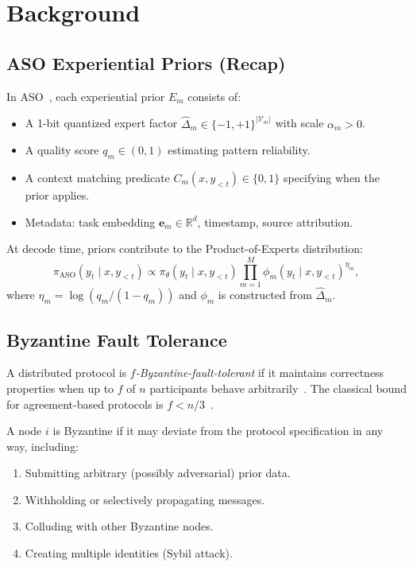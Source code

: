 \section{Background}

\label{sec:background}

\subsection{ASO Experiential Priors (Recap)}

In ASO~\cite{hanzo2026aso}, each experiential prior $E_m$ consists of:
\begin{itemize}[leftmargin=1.5em]
    \item A 1-bit quantized expert factor $\widehat{\Delta}_m \in \{-1, +1\}^{|\mathcal{V}_m|}$
          with scale $\alpha_m > 0$.
    \item A quality score $q_m \in (0, 1)$ estimating pattern reliability.
    \item A context matching predicate $C_m(x, y_{<t}) \in \{0, 1\}$ specifying
          when the prior applies.
    \item Metadata: task embedding $\bm{e}_m \in \mathbb{R}^d$, timestamp,
          source attribution.
\end{itemize}

At decode time, priors contribute to the Product-of-Experts distribution:
\begin{equation}
    \pi_{\text{ASO}}(y_t \mid x, y_{<t}) \propto \pi_\theta(y_t \mid x, y_{<t})
    \prod_{m=1}^{M} \phi_m(y_t \mid x, y_{<t})^{\eta_m},
    \label{eq:poe-recap}
\end{equation}
where $\eta_m = \log(q_m / (1 - q_m))$ and $\phi_m$ is constructed from
$\widehat{\Delta}_m$.

\subsection{Byzantine Fault Tolerance}

A distributed protocol is \emph{$f$-Byzantine-fault-tolerant} if it maintains
correctness properties when up to $f$ of $n$ participants behave
arbitrarily~\cite{lamport1982byzantine}. The classical bound for
agreement-based protocols is $f < n/3$~\cite{pease1980reaching}.

\begin{definition}
A node $i$ is Byzantine if it may deviate from the protocol specification in any
way, including:
\begin{enumerate}[leftmargin=1.5em]
    \item Submitting arbitrary (possibly adversarial) prior data.
    \item Withholding or selectively propagating messages.
    \item Colluding with other Byzantine nodes.
    \item Creating multiple identities (Sybil attack).
\end{enumerate}
\end{definition}

